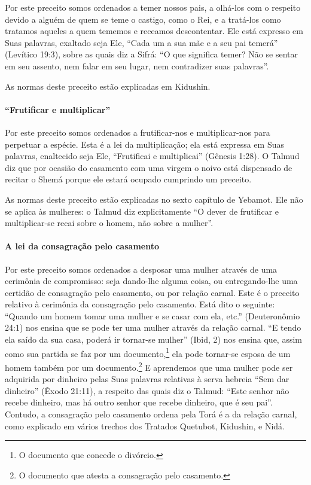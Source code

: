 Por este preceito somos ordenados a temer nossos pais, a olhá-los com o
respeito devido a alguém de quem se teme o castigo, como o Rei, e a
tratá-los como tratamos aqueles a quem tememos e receamos descontentar.
Ele está expresso em Suas palavras, exaltado seja Ele, ``Cada um a sua
mãe e a seu pai temerá'' (Levítico 19:3), sobre as quais diz a Sifrá:
``O que significa temer? Não se sentar em seu assento, nem falar em seu
lugar, nem contradizer suas palavras''.

As normas deste preceito estão explicadas em Kidushin.

\paragraph{``Frutificar e multiplicar''}

Por este preceito somos ordenados a frutificar-nos e multiplicar-nos
para perpetuar a espécie. Esta é a lei da multiplicação; ela está
expressa em Suas palavras, enaltecido seja Ele, ``Frutificai e
multiplicai'' (Gênesis 1:28). O Talmud diz que por ocasião do casamento
com uma virgem o noivo está dispensado de recitar o Shemá porque ele
estará ocupado cumprindo um preceito.

As normas deste preceito estão explicadas no sexto capítulo de Yebamot.
Ele não se aplica às mulheres: o Talmud diz explicitamente ``O dever de
frutificar e multiplicar-se recai sobre o homem, não sobre a mulher''.

\paragraph{A lei da consagração pelo casamento}

Por este preceito somos ordenados a desposar uma mulher através de uma
cerimônia de compromisso: seja dando-lhe alguma coisa, ou entregando-lhe
uma certidão de consagração pelo casamento, ou por relação carnal. Este
é o preceito relativo à cerimônia da consagração pelo casamento. Está
dito o seguinte: ``Quando um homem tomar uma mulher e se casar com ela,
etc.'' (Deuteronômio 24:1) nos ensina que se pode ter uma mulher através da relação
carnal. ``E tendo ela saído da sua casa, poderá ir tornar-se mulher''
(Ibid, 2) nos ensina que, assim como sua partida se faz por um
documento,\footnote{O documento que concede o divórcio.} ela pode tornar-se esposa de um homem
também por um documento.\footnote{O documento que atesta a consagração pelo casamento.} E aprendemos que uma
mulher pode ser adquirida por dinheiro pelas Suas palavras relativas à
serva hebreia ``Sem dar dinheiro'' (Êxodo 21:11), a respeito das quais
diz o Talmud: ``Este senhor não recebe dinheiro, mas há outro senhor que
recebe dinheiro, que é seu pai''. Contudo, a consagração pelo casamento
ordena pela Torá é a da relação carnal, como explicado em vários
trechos dos Tratados Quetubot, Kidushin, e Nidá.

